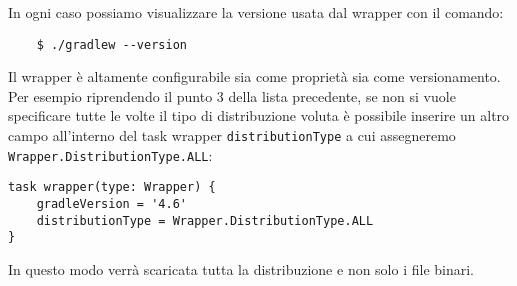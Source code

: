 In ogni caso possiamo visualizzare la versione usata dal wrapper con il comando:
\begin{verbatim}
    $ ./gradlew --version \end{verbatim}
Il wrapper è altamente configurabile sia come proprietà sia come versionamento. Per esempio riprendendo il punto 3 della lista precedente, se non si vuole specificare tutte le volte il tipo di distribuzione voluta è possibile inserire un altro campo all’interno del task wrapper \texttt{distributionType} a cui assegneremo \texttt{Wrapper.DistributionType.ALL}:
\begin{verbatim}
task wrapper(type: Wrapper) {
    gradleVersion = '4.6'
    distributionType = Wrapper.DistributionType.ALL
}\end{verbatim}
In questo modo verrà scaricata tutta la distribuzione e non solo i file binari.